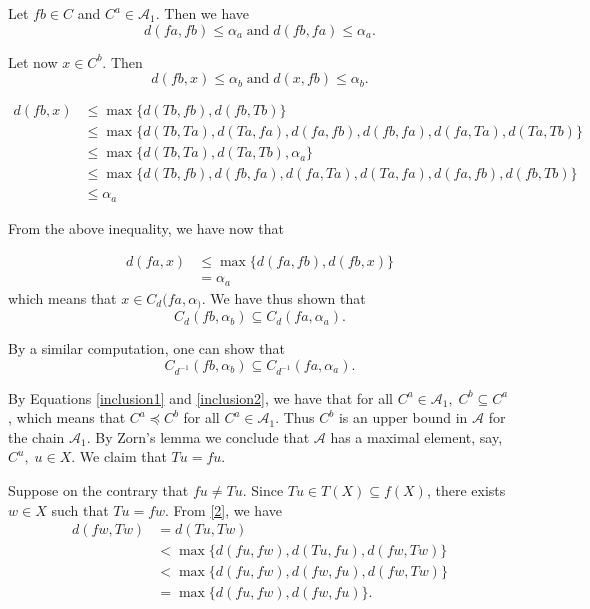 \documentclass[10pt,a4paper]{article}
\begin{document}
{Let $fb\in C$ and $C^a\in \mathcal{A}_1$. Then we have \[d(fa,fb)\leq \alpha_a \; \text{and}\; d(fb,fa)\leq \alpha_a. \]

Let now $x\in C^b$. Then \[d(fb,x)\leq \alpha_b \; \text{and}\; d(x,fb)\leq \alpha_b . \]

\begin{align*}
d(fb,x)&\leq \max\{d(Tb,fb),d(fb,Tb)\} \\
&\leq \max \lbrace d(Tb,Ta),d(Ta,fa),d(fa,fb), d(fb,fa), d(fa,Ta), d(Ta,Tb)\rbrace \\
&\leq \max\lbrace d(Tb,Ta),d(Ta,Tb),\alpha_a \rbrace \\
&\leq \max\lbrace d(Tb,fb),d(fb,fa),d(fa,Ta), d(Ta,fa),d(fa,fb),d(fb,Tb)\}\\
&\leq \alpha_a
\end{align*}

From the above inequality, we have now that

\begin{align*}
d(fa,x)&\leq \max\lbrace d(fa,fb),d(fb,x)\rbrace \\
&= \alpha_a
\end{align*}
which means that $x\in C_d(fa,\alpha_)$. We have thus shown that 
\begin{equation} \label{inclusion1} 
C_d(fb,\alpha_b)\subseteq C_d(fa,\alpha_a).
 \end{equation} 

By a similar computation, one can show that
\begin{equation} \label{inclusion2} 
C_{d^{-1}}(fb,\alpha_b)\subseteq C_{d^{-1}}(fa,\alpha_a). 
\end{equation}

By Equations \eqref{inclusion1} and \eqref{inclusion2}, we have that for all $C^a\in \mathcal{A}_1,\;C^b\subseteq C^a$, which means that $C^a\preceq C^b$ for all $C^a\in \mathcal{A}_1$. Thus $C^b$ is an upper bound in $\mathcal{A}$ for the chain $\mathcal{A}_1$. By Zorn's lemma we conclude that $\mathcal{A}$ has a maximal element, say, $C^u,\; u\in X$. We claim that $Tu=fu$.

Suppose on the contrary that $fu\neq Tu$. Since $Tu \in T(X)\subseteq f(X)$, there exists $w\in X$ such that $Tu=fw$. From \eqref{2}, we have
\begin{align*}
  d(fw,Tw)&=d(Tu,Tw) \\
           & < \max\{ d(fu,fw),d(Tu,fu),d(fw,Tw)  \} \\
           & < \max \{d(fu,fw),d(fw,fu),d(fw,Tw) \} \\
           & = \max \{d(fu,fw),d(fw,fu)\}.
\end{align*}

}
\end{document}
